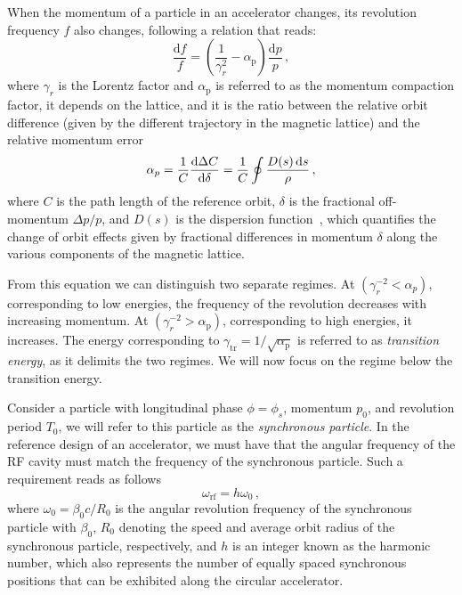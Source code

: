 When the momentum of a particle in an accelerator changes, its revolution frequency $f$ also changes, following a relation that reads:
\begin{equation}
    \frac{\mathrm{d} f}{f}=\left(\frac{1}{\gamma_r^2}-\alpha_{\mathrm{p}}\right) \frac{\mathrm{d} p}{p}\,,
\end{equation}
where $\gamma_r$ is the Lorentz factor and $\alpha_{\mathrm{p}}$ is referred to as the momentum compaction factor, it depends on the lattice, and it is the ratio between the relative orbit difference (given by the different trajectory in the magnetic lattice) and the relative momentum error
\begin{equation}
    \alpha_p = \frac{1}{C}\dv{\Delta C}{\delta} = \frac{1}{C} \oint \frac{{D}(s)\,\mathrm{d}s}{\rho}\,,
\end{equation}
where $C$ is the path length of the reference orbit, $\delta$ is the fractional off-momentum $\Delta p / p$, and ${D}(s)$ is the dispersion function~\cite{Lee:2651939}, which quantifies the change of orbit effects given by fractional differences in momentum $\delta$ along the various components of the magnetic lattice.

From this equation we can distinguish two separate regimes. At $\left(\gamma_r^{-2}<\alpha_p\right)$, corresponding to low energies, the frequency of the revolution decreases with increasing momentum. At $\left(\gamma_r^{-2}>\alpha_{\mathrm{p}}\right)$, corresponding to high energies, it increases. The energy corresponding to $\gamma_{\mathrm{tr}}=1 / \sqrt{\alpha_{\mathrm{p}}}$ is referred to as \textit{transition energy}, as it delimits the two regimes. We will now focus on the regime below the transition energy.

Consider a particle with longitudinal phase $\phi=\phi_s$, momentum $p_0$, and revolution period $T_0$, we will refer to this particle as the \textit{synchronous particle}. In the reference design of an accelerator, we must have that the angular frequency of the RF cavity must match the frequency of the synchronous particle. Such a requirement reads as follows
\begin{equation}
    \omega_{\mathrm{rf}}=h \omega_0\,,
\end{equation}
where $\omega_0=\beta_0 c / R_0$ is the angular revolution frequency of the synchronous particle with $\beta_0$, $R_0$ denoting the speed and average orbit radius of the synchronous particle, respectively, and $h$ is an integer known as the harmonic number, which also represents the number of equally spaced synchronous positions that can be exhibited along the circular accelerator.

